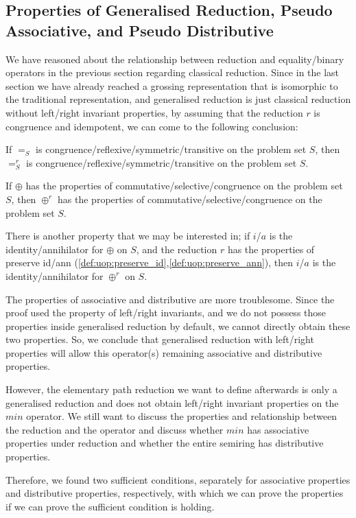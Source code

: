 \documentclass[a4paper,12pt,twoside,openright]{report}
\begin{document}
\subsection{Properties of Generalised Reduction, Pseudo Associative, and Pseudo Distributive}
We have reasoned about the relationship between reduction and equality/binary operators in the previous section regarding classical reduction. 
Since in the last section we have already reached a grossing representation that is isomorphic to the traditional representation, and generalised reduction is just classical reduction without left/right invariant properties, by assuming that the reduction $r$ is congruence and idempotent, we can come to the following conclusion:

If $=_S$ is congruence/reflexive/symmetric/transitive on the problem set $S$, then $=^r_S$ is congruence/reflexive/symmetric/transitive on the problem set $S$.

If $\oplus$ has the properties of commutative/selective/congruence on the problem set $S$, then $\oplus^r$ has the properties of commutative/selective/congruence on the problem set $S$.

There is another property that we may be interested in; if $i$/$a$ is the identity/annihilator for $\oplus$ on $S$, and the reduction $r$ has the properties of preserve id/ann (\ref{def:uop:preserve_id},\ref{def:uop:preserve_ann}), then $i$/$a$ is the identity/annihilator for $\oplus^r$ on $S$.

The properties of associative and distributive are more troublesome. Since the proof used the property of left/right invariants, and we do not possess those properties inside generalised reduction by default, we cannot directly obtain these two properties. So, we conclude that generalised reduction with left/right properties will allow this operator(s) remaining associative and distributive properties.

However, the elementary path reduction we want to define afterwards is only a generalised reduction and does not obtain left/right invariant properties on the $min$ operator. We still want to discuss the properties and relationship between the reduction and the operator and discuss whether $min$ has associative properties under reduction and whether the entire semiring has distributive properties.

Therefore, we found two sufficient conditions, separately for associative properties and distributive properties, respectively, with which we can prove the properties if we can prove the sufficient condition is holding.
\end{document}
